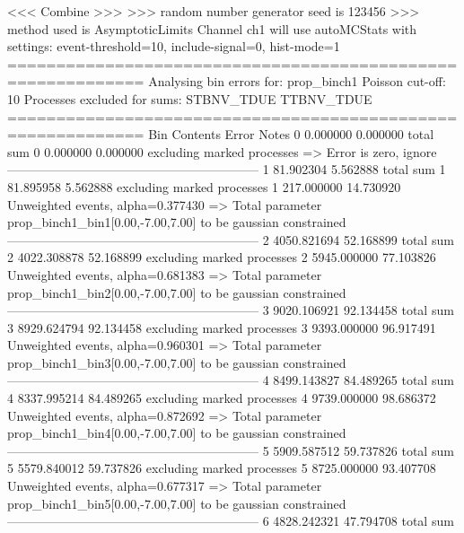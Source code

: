 <<< Combine >>> 
>>> random number generator seed is 123456
>>> method used is AsymptoticLimits
Channel ch1 will use autoMCStats with settings: event-threshold=10, include-signal=0, hist-mode=1
============================================================
Analysing bin errors for: prop_binch1
Poisson cut-off: 10
Processes excluded for sums: STBNV_TDUE TTBNV_TDUE
============================================================
Bin        Contents        Error           Notes                         
0          0.000000        0.000000        total sum                     
0          0.000000        0.000000        excluding marked processes    
  => Error is zero, ignore      
------------------------------------------------------------
1          81.902304       5.562888        total sum                     
1          81.895958       5.562888        excluding marked processes    
1          217.000000      14.730920       Unweighted events, alpha=0.377430
  => Total parameter prop_binch1_bin1[0.00,-7.00,7.00] to be gaussian constrained
------------------------------------------------------------
2          4050.821694     52.168899       total sum                     
2          4022.308878     52.168899       excluding marked processes    
2          5945.000000     77.103826       Unweighted events, alpha=0.681383
  => Total parameter prop_binch1_bin2[0.00,-7.00,7.00] to be gaussian constrained
------------------------------------------------------------
3          9020.106921     92.134458       total sum                     
3          8929.624794     92.134458       excluding marked processes    
3          9393.000000     96.917491       Unweighted events, alpha=0.960301
  => Total parameter prop_binch1_bin3[0.00,-7.00,7.00] to be gaussian constrained
------------------------------------------------------------
4          8499.143827     84.489265       total sum                     
4          8337.995214     84.489265       excluding marked processes    
4          9739.000000     98.686372       Unweighted events, alpha=0.872692
  => Total parameter prop_binch1_bin4[0.00,-7.00,7.00] to be gaussian constrained
------------------------------------------------------------
5          5909.587512     59.737826       total sum                     
5          5579.840012     59.737826       excluding marked processes    
5          8725.000000     93.407708       Unweighted events, alpha=0.677317
  => Total parameter prop_binch1_bin5[0.00,-7.00,7.00] to be gaussian constrained
------------------------------------------------------------
6          4828.242321     47.794708       total sum                     
